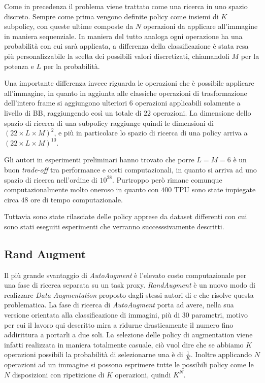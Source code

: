 Come in precedenza il problema viene trattato come una ricerca in uno spazio discreto. Sempre come prima vengono definite policy come insiemi di $K$ subpolicy, con queste ultime composte da $N$ operazioni da applicare all'immagine in maniera sequenziale. In maniera del tutto analoga ogni operazione ha una probabilità con cui sarà applicata, a differenza della classificazione è stata resa più personalizzabile la scelta dei possibili valori discretizati, chiamandoli $M$ per la potenza e $L$ per la probabilità. 

Una importante differenza invece riguarda le operazioni che è possibile applicare all'immagine, in quanto in aggiunta alle classiche operazioni di trasformazione dell'intero frame si aggiungono ulteriori $6$ operazioni applicabili solamente a livello di \ac{BB}, raggiungendo così un totale di $22$ operazioni. La dimensione dello spazio di ricerca di una subpolicy raggiunge quindi le dimensioni di $(22 \times L \times M)^2$, e più in particolare lo spazio di ricerca di una policy arriva a $(22 \times L \times M)^{10}$.


Gli autori in esperimenti preliminari hanno trovato che porre $L = M = 6$ è un buon \textit{trade-off} tra performance e costi computazionali, in quanto si arriva ad uno spazio di ricerca nell'ordine di $10^{28}$. Purtroppo però rimane comunque computazionalmente molto oneroso in quanto con $400$ \ac{TPU} sono state impiegate circa $48$ ore di tempo computazionale. 

Tuttavia sono state rilasciate delle policy apprese da dataset differenti con cui sono stati eseguiti esperimenti che verranno successsivamente descritti. 
\subsection{Rand Augment}
\label{subsec:rand_augment}
Il più grande svantaggio di \textit{AutoAugment} è l'elevato costo computazionale per una fase di ricerca separata su un task proxy. \textit{RandAugment} \cite{DBLP:journals/corr/abs-1909-13719} è un nuovo modo di realizzare \textit{Data Augmentation} proposto dagli stessi autori di \cite{DBLP:journals/corr/abs-1805-09501} e \cite{DBLP:journals/corr/abs-1906-11172} che risolve questa problematica. La fase di ricerca di \textit{AutoAugment} porta ad avere, nella sua versione orientata alla classificazione di immagini, più di 30 parametri, motivo per cui il lavoro qui descritto mira a ridurne drasticamente il numero fino addirittura a portarli a due soli. La selezione delle policy di augmentation viene infatti realizzata in maniera totalmente casuale, ciò vuol dire che se abbiamo $K$ operazioni possibili la probabilità di selezionarne una è di $\frac{1}{K}$. Inoltre applicando $N$ operazioni ad un immagine si possono esprimere tutte le possibili policy come le $N$ disposizioni con ripetizione di $K$ operazioni, quindi $K^N$.

